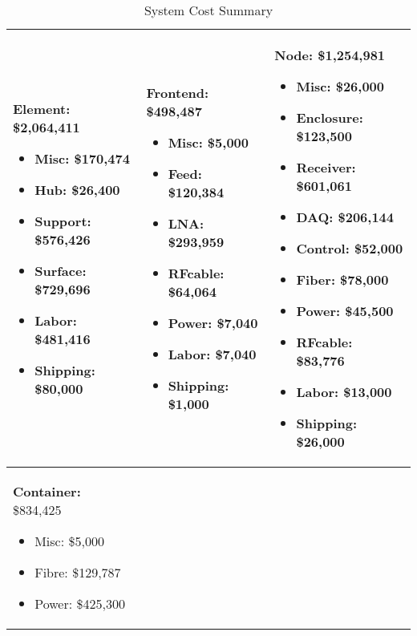 \begin{table}[t]
\centering
\caption{System Cost Summary}
\label{tab:budgetsummary}
\begin{tabular}{| p{2in} | p{2in} | p{2in} | }\\ \hline
\noindent
\textbf{Element:}  \$2,064,411
\begin{itemize}[parsep=-2pt, itemsep=-3pt]
\item Misc:   \$170,474
\item Hub:   \$26,400
\item Support:   \$576,426
\item Surface:   \$729,696
\item Labor:   \$481,416
\item Shipping:   \$80,000
\end{itemize}
 &
 \noindent
\textbf{Frontend:}  \$498,487
\begin{itemize}[parsep=-2pt, itemsep=-3pt]
\item Misc:   \$5,000
\item Feed:   \$120,384
\item LNA:   \$293,959
\item RFcable:   \$64,064
\item Power:   \$7,040
\item Labor:   \$7,040
\item Shipping:   \$1,000
\end{itemize}
 &
 \noindent
\textbf{Node:}  \$1,254,981
\begin{itemize}[parsep=-2pt, itemsep=-3pt]
\item Misc:   \$26,000
\item Enclosure:   \$123,500
\item Receiver:   \$601,061
\item DAQ:   \$206,144
\item Control:   \$52,000
\item Fiber:   \$78,000
\item Power:   \$45,500
\item RFcable:   \$83,776
\item Labor:   \$13,000
\item Shipping:   \$26,000
\end{itemize}
\\ \hline
\noindent
\textbf{Container:}  \$834,425
\begin{itemize}[parsep=-2pt, itemsep=-3pt]
\item Misc:   \$5,000
\item Fibre:   \$129,787
\item Power:   \$425,300

\end{itemize}
\end{tabular}
\end{table}
